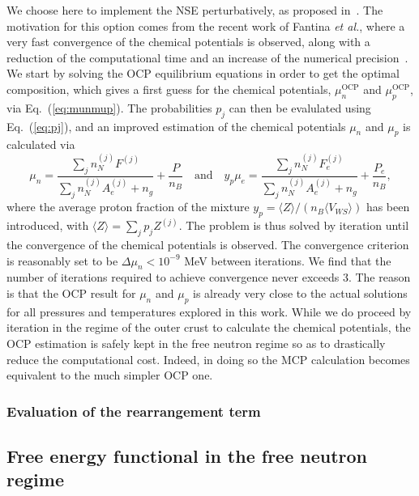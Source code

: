 We choose here to implement the NSE perturbatively, as proposed 
in~\cite{Grams2018}. 
The motivation for this option comes from the recent work of Fantina 
\textit{et al.}, where a very fast convergence of the chemical potentials is 
observed, along with a reduction of the computational time and an increase of
the numerical precision~\cite{Fantina2020}.
We start by solving the OCP equilibrium equations in order to get the 
optimal composition, which gives a first guess for the chemical potentials,
$\mu_n^{\text{OCP}}$ and $\mu_p^{\text{OCP}}$, via Eq.~(\ref{eq:munmup}). 
The probabilities $p_j$ can then be evalulated using Eq.~(\ref{eq:pj}), and an
improved estimation of the chemical potentials $\mu_n$ and $\mu_p$ is
calculated via
%
\begin{equation}
  \mu_n = \frac{\sum_j n_N^{(j)}F^{(j)}}{\sum_j n_N^{(j)}A_e^{(j)} + n_g} +
  \frac{P}{n_B} \quad \text{and} \quad
  y_p\mu_e = \frac{\sum_j n_N^{(j)}F_e^{(j)}}{\sum_j n_N^{(j)}A_e^{(j)} + n_g} 
  + \frac{P_e}{n_B},
\end{equation}
%
where the average proton fraction of the mixture $y_p=\langle
Z\rangle/(n_B\langle V_{WS}\rangle)$ has been introduced, with 
$\langle Z \rangle = \sum_j p_j Z^{(j)}$. The problem is thus solved by
iteration until the convergence of the chemical potentials is observed. The
convergence criterion is reasonably set to be $\Delta \mu_n < 10^{-9}$ MeV
between iterations.
We find that the number of iterations required to achieve convergence never 
exceeds 3. The reason is that the OCP result for $\mu_n$ and $\mu_p$ is 
already very close to the actual solutions for all pressures and 
temperatures explored in this work. While we do proceed by iteration in the
regime of the outer crust to calculate the chemical potentials, the OCP 
estimation is safely kept in the free neutron regime so as to drastically 
reduce the computational cost. Indeed, in doing so the MCP calculation becomes 
equivalent to the much simpler OCP one.

\subsubsection{Evaluation of the rearrangement term}\label{subsubsec:rear}

\subsection{Free energy functional in the free neutron 
regime}\label{subsec:freeenfunctional}

